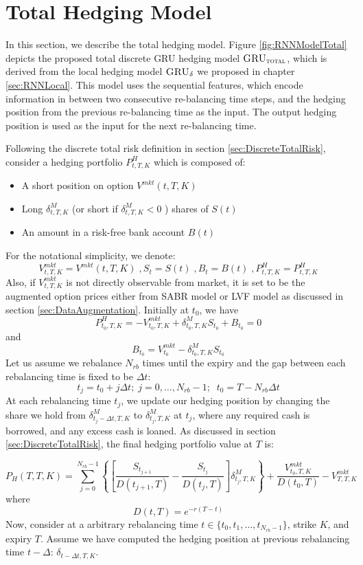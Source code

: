 \documentclass[letterpaper,12pt,titlepage,oneside,final]{book}
\numberwithin{equation}{section}
\theoremstyle{definition}
\newcommand{\model}{\textsc{GRU}_\delta}
\newcommand{\modelT}{\textsc{GRU}_{\textsc{total}}}
\newcommand{\DT}{\Delta t}
\newcommand{\Vmkt}{V^{mkt}}
\newcommand{\Smkt}{S}
\begin{document}
\section{Total Hedging Model}
In this section, we describe the total hedging model.
Figure \ref{fig:RNNModelTotal} depicts the proposed total discrete GRU  hedging  model $\modelT$,
which is derived from the local hedging model $\model$ we proposed in chapter \ref{sec:RNNLocal}.
This model uses the sequential features, which encode information in between two consecutive re-balancing time steps, and the hedging position from the previous re-balancing time as the input. The output hedging position is used as the input for the next re-balancing time.

Following the discrete total risk definition in section \ref{sec:DiscreteTotalRisk}, consider a hedging portfolio $P^{H}_{t,T,K}$ which is composed of:
\begin{itemize}
	\item A short position on option $\Vmkt(t,T,K)$
	\item Long $\delta^{M}_{t,T,K}$ (or short if $\delta^{M}_{t,T,K}<0$ ) shares of $\Smkt(t)$
	\item An amount in a risk-free bank account $B(t)$
\end{itemize}
For the notational simplicity, we denote:
\[
\Vmkt_{t,T,K}=\Vmkt (t,T,K)\;,\Smkt_{t}=\Smkt(t)\;,B_t=B(t)\;, P^{H}_{t,T,K}=P^{H}_{t,T,K}
\]
Also, if $\Vmkt_{t,T,K}$ is not directly observable from market, it is set to be the augmented option prices either from SABR model or LVF model as discussed in section \ref{sec:DataAugmentation}. 
Initially at $t_0$, we have
\[
P^H_{t_0,T,K}=  -V_{t_0,T,K}^{mkt}+\delta^{M}_{t_0,T,K} S_{t_0}+ B_{t_0}=0
\]
and
\[
B_{t_0}=V_{t_0}^{mkt}-\delta^{M}_{t_0,T,K} S_{t_0}
\]
Let us assume we rebalance $N_{rb}$ times until the expiry and the gap between each rebalancing time is fixed to be $\DT$:
\[
t_j=t_0+j \Delta t;\; j=0,\dots,N_{rb}-1;\;\;t_0=T-N_{rb}\DT
\]
At each rebalancing time $t_j$, we update our hedging position by changing the share we hold from $\delta^{M}_{t_{j}-\Delta t,T,K}$ to $\delta^{M}_{t_j,T,K}$ at $t_j$, where any required cash is borrowed, and any excess cash is loaned. As discussed in section \ref{sec:DiscreteTotalRisk}, the final hedging portfolio value at $T$ is:

\begin{equation}
P_H(T,T,K)=\sum_{j=0}^{N_{rb}-1}\left\{ \left[\frac{\Smkt_{t_{j+1}}}{D(t_{j+1},T)}-\frac{\Smkt_{t_{j}}}{D(t_{j},T)}\right] \delta^M_{t_j,T,K} \right\}+\frac{\Vmkt_{t_0,T,K}}{D(t_{0},T)}-\Vmkt_{T,T,K}
\label{eq:FinalHValue}
\end{equation}
where
\[D(t,T)=e^{-r(T-t)}\]
Now, consider at a arbitrary rebalancing time $t \in \{t_0,t_1, \dots, t_{N_{rb}-1}\}$, strike $K$, and expiry $T$. Assume we have computed the hedging position at previous rebalancing time $t-\Delta$: $\delta_{t-\Delta t, T,K}$. 
\end{document}
